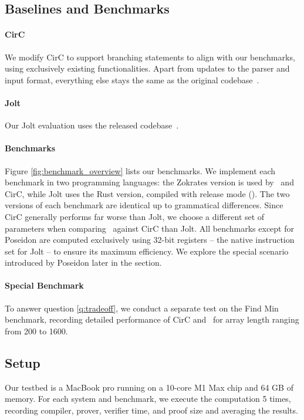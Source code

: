 \subsection{Baselines and Benchmarks}
\paragraph{CirC} We modify CirC to support branching statements to align with our benchmarks, using exclusively existing functionalities. Apart from updates to the parser and input format, everything else stays the same as the original codebase~\cite{circ_codebase}.

\paragraph{Jolt} Our Jolt evaluation uses the released codebase~\cite{jolt_codebase}.

\paragraph{Benchmarks} Figure \ref{fig:benchmark_overview} lists our benchmarks. We implement each benchmark in two programming languages: the Zokrates version is used by \CoBBl~and CirC, while Jolt uses the Rust version, compiled with release mode (). The two versions of each benchmark are identical up to grammatical differences. Since CirC generally performs far worse than Jolt, we choose a different set of parameters when comparing \CoBBl~against CirC than Jolt. All benchmarks except for Poseidon are computed exclusively using 32-bit registers -- the native instruction set for Jolt -- to ensure its maximum efficiency. We explore the special scenario introduced by Poseidon later in the section.

\paragraph{Special Benchmark} To answer question \ref{q:tradeoff}, we conduct a separate test on the Find Min benchmark, recording detailed performance of CirC and \CoBBl~for array length ranging from 200 to 1600.



\subsection{Setup}
Our testbed is a MacBook pro running on a 10-core M1 Max chip and 64 GB of memory. For each system and benchmark, we execute the computation 5 times, recording compiler, prover, verifier time, and proof size and averaging the results. 

